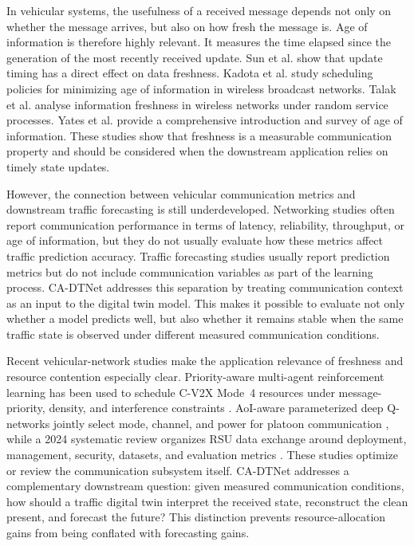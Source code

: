 \documentclass[pdflatex,sn-mathphys-num]{sn-jnl}%
\newenvironment{changed}{\color{blue}}{}
\theoremstyle{thmstyleone}%
\theoremstyle{thmstyletwo}%
\theoremstyle{thmstylethree}%
\begin{document}
In vehicular systems, the usefulness of a received message depends not only on whether the message arrives, but also on how fresh the message is. Age of information is therefore highly relevant. It measures the time elapsed since the generation of the most recently received update. Sun et al. \cite{sun2017update} show that update timing has a direct effect on data freshness. Kadota et al. \cite{kadota2018aoi} study scheduling policies for minimizing age of information in wireless broadcast networks. Talak et al. \cite{talak2020aoi} analyse information freshness in wireless networks under random service processes. Yates et al. \cite{yates2021aoi} provide a comprehensive introduction and survey of age of information. These studies show that freshness is a measurable communication property and should be considered when the downstream application relies on timely state updates.

However, the connection between vehicular communication metrics and downstream traffic forecasting is still underdeveloped. Networking studies often report communication performance in terms of latency, reliability, throughput, or age of information, but they do not usually evaluate how these metrics affect traffic prediction accuracy. Traffic forecasting studies usually report prediction metrics but do not include communication variables as part of the learning process. CA-DTNet addresses this separation by treating communication context as an input to the digital twin model. This makes it possible to evaluate not only whether a model predicts well, but also whether it remains stable when the same traffic state is observed under different measured communication conditions.

\begin{changed}
Recent vehicular-network studies make the application relevance of freshness and resource contention especially clear. Priority-aware multi-agent reinforcement learning has been used to schedule C-V2X Mode~4 resources under message-priority, density, and interference constraints \cite{shakir2025priority}. AoI-aware parameterized deep Q-networks jointly select mode, channel, and power for platoon communication \cite{shakir2026pdqn}, while a 2024 systematic review organizes RSU data exchange around deployment, management, security, datasets, and evaluation metrics \cite{shakir2024rsu}. These studies optimize or review the communication subsystem itself. CA-DTNet addresses a complementary downstream question: given measured communication conditions, how should a traffic digital twin interpret the received state, reconstruct the clean present, and forecast the future? This distinction prevents resource-allocation gains from being conflated with forecasting gains.
\end{changed}
\end{document}
